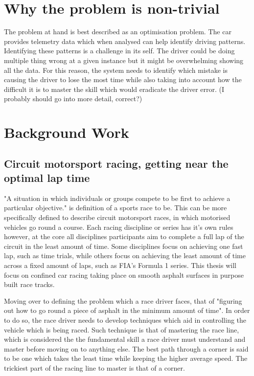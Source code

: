 \documentclass{article}
\begin{document}
\section{Why the problem is non-trivial}
The problem at hand is best described as an optimisation problem. The car provides telemetry data which when analysed can help identify driving patterns. Identifying these patterns is a challenge in its self. The driver could be doing multiple thing wrong at a given instance but it might be overwhelming showing all the data. For this reason, the system needs to identify which mistake is causing the driver to lose the most time while also taking into account how the difficult it is to master the skill which would eradicate the driver error. (I probably should go into more detail, correct?)

\section{Background Work}

\subsection{Circuit motorsport racing, getting near the optimal lap time}

"A situation in which individuals or groups compete to be first to achieve a particular objective." is definition of a sports race to be. This can be more specifically defined to describe circuit motorsport races, in which motorised vehicles go round a course. Each racing discipline or series has it's own rules however, at the core all disciplines participants aim to complete a full lap of the circuit in the least amount of time. Some disciplines focus on achieving one fast lap, such as time trials, while others focus on achieving the least amount of time across a fixed amount of laps, such as FIA's Formula 1 series. This thesis will focus on confined car racing taking place on smooth asphalt surfaces in purpose built race tracks.

Moving over to defining the problem which a race driver faces, that of "figuring out how to go round a piece of asphalt in the minimum amount of time"\cite{GoingFaster}. In order to do so, the race driver needs to develop techniques which aid in controlling the vehicle which is being raced. Such technique is that of mastering the race line, which is considered the the fundamental skill a race driver must understand and master before moving on to anything else\cite{GoingFaster}. The best path through a corner is said to be one which takes the least time while keeping the higher average speed\cite{beckman1991physics}. The trickiest part of the racing line to master is that of a corner.
\end{document}
